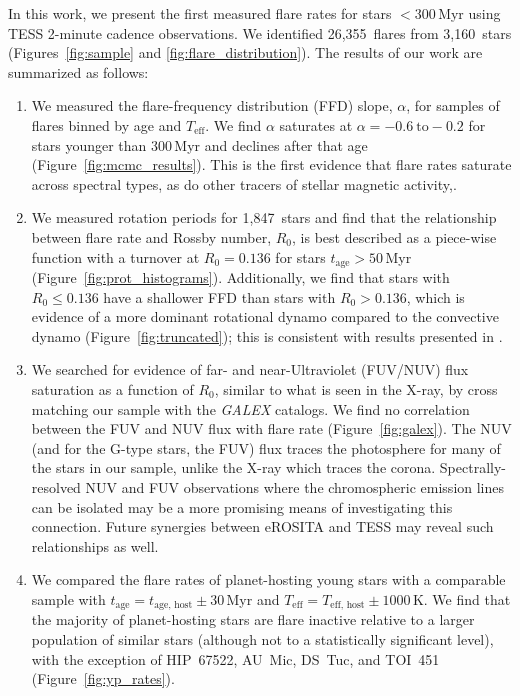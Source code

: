 \documentclass[twocolumn, linenumbers]{aastex631}
\newcommand{\nflares}{26,355}
\newcommand{\nflarestars}{3,160}
\newcommand{\nprot}{1,847}
\begin{document}
In this work, we present the first measured flare rates for stars $< 300$\,Myr using TESS 2-minute cadence observations. We identified \nflares\ flares from \nflarestars\ stars (Figures~\ref{fig:sample} and \ref{fig:flare_distribution}). The results of our work are summarized as follows:

\begin{enumerate}
  \item We measured the flare-frequency distribution (FFD) slope, $\alpha$, for samples of flares binned by age and $T_\textrm{eff}$. We find $\alpha$ saturates at $\alpha = -0.6 ~ \textrm{to} -0.2$ for stars younger than 300\,Myr and declines after that age (Figure~\ref{fig:mcmc_results}). This is the first evidence that flare rates saturate across spectral types, as do  other tracers of stellar magnetic activity,.

  \item We measured rotation periods for \nprot\ stars and find that the relationship between flare rate and Rossby number, $R_0$, is best described as a piece-wise function with a turnover at $R_0 = 0.136$ for stars $t_\textrm{age} > 50$\,Myr (Figure~\ref{fig:prot_histograms}). Additionally, we find that stars with $R_0 \leq 0.136$ have a shallower FFD than stars with $R_0 > 0.136$, which is evidence of a more dominant rotational dynamo compared to the convective dynamo (Figure~\ref{fig:truncated}); this is consistent with results presented in \cite{seligman22}.

  \item We searched for evidence of far- and near-Ultraviolet (FUV/NUV) flux saturation as a function of $R_0$, similar to what is seen in the X-ray, by cross matching our sample with the \textit{GALEX} catalogs. We find no correlation between the FUV and NUV flux with flare rate (Figure~\ref{fig:galex}). The NUV (and for the G-type stars, the FUV) flux traces the photosphere for many of the stars in our sample, unlike the X-ray which traces the corona.  Spectrally-resolved NUV and FUV observations where the chromospheric emission lines can be  isolated may be a more promising means of investigating this connection. Future synergies between eROSITA and TESS may reveal such relationships as well.

  \item We compared the flare rates of planet-hosting young stars with a comparable sample with $t_\text{age} = t_\textrm{age, host} \pm 30$\,Myr and $T_\textrm{eff} = T_\textrm{eff, host} \pm 1000$\,K. We find that the majority of planet-hosting stars are flare inactive relative to a larger population of similar stars (although not to a statistically significant level), with the exception of HIP~67522, AU~Mic, DS~Tuc, and TOI~451 (Figure~\ref{fig:yp_rates}).


\end{enumerate}
\end{document}
